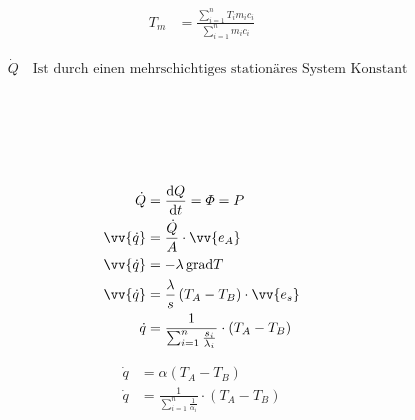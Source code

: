 \begin{boxleft}
\end{boxleft}\begin{boxrightshaded}
\begin{align*}
T_m&=\frac{\sum_{i=1}^n T_i m_i c_i}{\sum_{i=1}^n m_i c_i}
\end{align*}
\end{boxrightshaded}

\begin{boxshaded}
\begin{align*}
&\dot{Q} \quad\text{Ist durch einen mehrschichtiges stationäres System Konstant}
\end{align*}
\end{boxshaded}

\begin{boxleft}
\\
\\
\\
\\
\end{boxleft}\begin{boxrightshaded}
\begin{align*}
\dot{Q}&=\frac{\diff Q}{\diff t}=\varPhi=P\\
\vv{\dot{q}}&=\frac{\dot{Q}}{A}\cdot\vv{e_A}\\
\vv{\dot{q}}&=-\lambda\grad{T}\\
\vv{\dot{q}}&=\frac{\lambda}{s}\left(T_A-T_B\right)\cdot\vv{e_s}\\
\dot{q}&=\frac{1}{\sum_{i=1}^n\frac{s_i}{\lambda_i}}\cdot\left(T_A-T_B\right)
\end{align*}
\end{boxrightshaded}


\begin{boxleft}
\end{boxleft}\begin{boxrightshaded}
\begin{align*}
\dot{q}&=\alpha\left(T_A-T_B\right)\\
\dot{q}&=\frac{1}{\sum_{i=1}^n\frac{1}{\alpha_i}}\cdot\left(T_A-T_B\right)
\end{align*}
\end{boxrightshaded}

